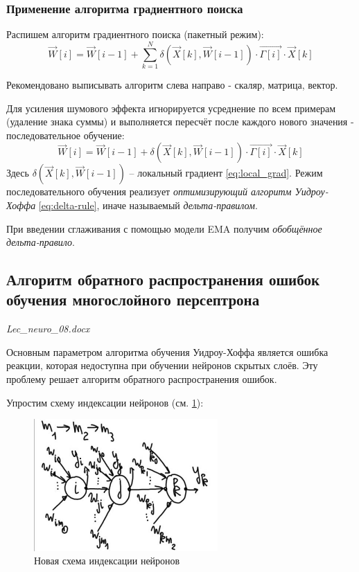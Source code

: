 \documentclass[a4paper]{article}
\numberwithin{equation}{subsection}
\begin{document}
\subsubsection{Применение алгоритма градиентного поиска}

Распишем алгоритм градиентного поиска (пакетный режим):
\begin{equation}
    \vec{W}[i] = \vec{W}[i-1] + \sum_{k=1}^{N} \delta(\vec{X}[k], \vec{W}[i-1])\cdot \vec{\Gamma[i]} \cdot \vec{X}[k]
\end{equation}

\begin{myquote}
    Рекомендовано выписывать алгоритм слева направо - скаляр, матрица, вектор.
\end{myquote}

Для усиления шумового эффекта игнорируется усреднение по всем примерам (удаление знака суммы) и выполняется 
пересчёт после каждого нового значения - последовательное обучение:
\begin{equation}
    \vec{W}[i] = \vec{W}[i-1] + \delta(\vec{X}[k], \vec{W}[i-1])\cdot \vec{\Gamma[i]} \cdot \vec{X}[k]
    \label{eq:delta-rule}
\end{equation}
Здесь $\delta(\vec{X}[k], \vec{W}[i-1])$ -- локальный градиент \ref{eq:local_grad}. Режим последовательного обучения 
реализует \textit{оптимизирующий алгоритм Уидроу-Хоффа} \ref{eq:delta-rule}, 
иначе называемый \textit{дельта-правилом}.

При введении сглаживания с помощью модели EMA получим \textit{обобщённое дельта-правило}.



\subsection{Алгоритм обратного распространения ошибок обучения многослойного персептрона}

\begin{myquote}
    \textit{Lec\_neuro\_08.docx}
\end{myquote}

Основным параметром алгоритма обучения Уидроу-Хоффа является ошибка реакции, которая 
недоступна при обучении нейронов скрытых слоёв.
Эту проблему решает алгоритм обратного распространения ошибок.

Упростим схему индексации нейронов (см. \ref{hyperflat_10_1}):

\begin{figure}[htbp]
    \centering
    \includegraphics[width=7cm]{hyperflat_10_1.jpeg}
    \caption{Новая схема индексации нейронов}
    \label{hyperflat_10_1}
\end{figure}
\end{document}
